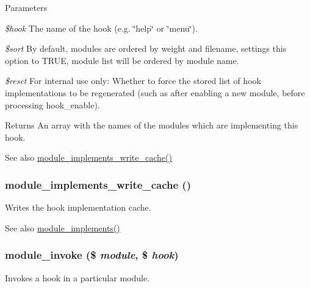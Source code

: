 \begin{DoxyParams}{Parameters}
\item[{\em \$hook}]The name of the hook (e.g. \char`\"{}help\char`\"{} or \char`\"{}menu\char`\"{}). \item[{\em \$sort}]By default, modules are ordered by weight and filename, settings this option to TRUE, module list will be ordered by module name. \item[{\em \$reset}]For internal use only: Whether to force the stored list of hook implementations to be regenerated (such as after enabling a new module, before processing hook\_\-enable).\end{DoxyParams}
\begin{DoxyReturn}{Returns}
An array with the names of the modules which are implementing this hook.
\end{DoxyReturn}
\begin{DoxySeeAlso}{See also}
\hyperlink{group__hooks_ga993e46e78bf9dfb0e940c0dcccf5e33d}{module\_\-implements\_\-write\_\-cache()} 
\end{DoxySeeAlso}
\hypertarget{group__hooks_ga993e46e78bf9dfb0e940c0dcccf5e33d}{
\subsubsection[{module\_\-implements\_\-write\_\-cache}]{\setlength{\rightskip}{0pt plus 5cm}module\_\-implements\_\-write\_\-cache ()}}
\label{group__hooks_ga993e46e78bf9dfb0e940c0dcccf5e33d}
Writes the hook implementation cache.

\begin{DoxySeeAlso}{See also}
\hyperlink{group__hooks_ga9191200072f2a641829e9d3c2759561f}{module\_\-implements()} 
\end{DoxySeeAlso}
\hypertarget{group__hooks_ga7547905cff161d057f9e71088ec67f05}{
\subsubsection[{module\_\-invoke}]{\setlength{\rightskip}{0pt plus 5cm}module\_\-invoke (\$ {\em module}, \/  \$ {\em hook})}}
\label{group__hooks_ga7547905cff161d057f9e71088ec67f05}
Invokes a hook in a particular module.

